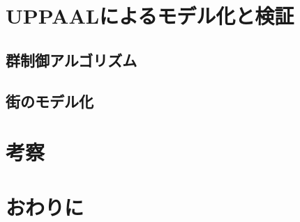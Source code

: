 \documentclass{tpu-sotu}
\begin{document}
\chapter{UPPAALによるモデル化と検証}
	\section{群制御アルゴリズム}
	\section{街のモデル化}
\chapter{考察}
\chapter{おわりに}
\acknowledgements
\begin{thebibliography}{1}
\end{thebibliography}
\end{document}
